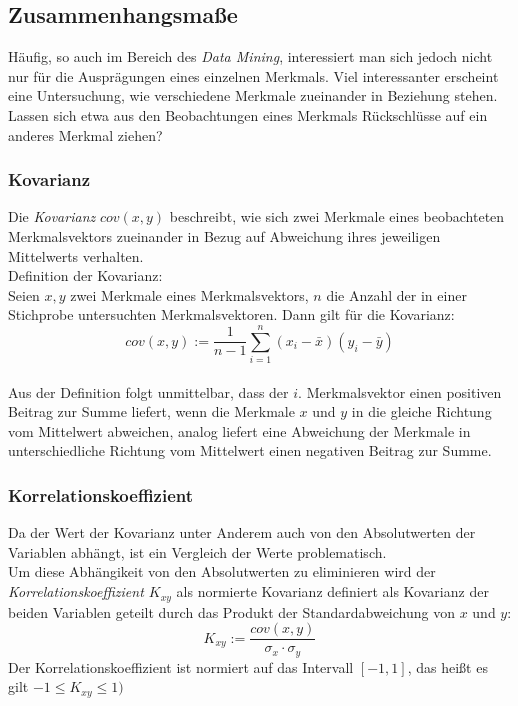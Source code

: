 \documentclass[a4paper]{scrartcl}
\begin{document}
\begin{multicols}{2}
                \subsection{Zusammenhangsmaße}
                    Häufig, so auch im Bereich des \emph{Data Mining}, interessiert man sich jedoch nicht nur für die Ausprägungen eines einzelnen Merkmals. Viel interessanter erscheint eine Untersuchung, wie verschiedene Merkmale zueinander in Beziehung stehen. Lassen sich etwa aus den Beobachtungen eines Merkmals Rückschlüsse auf ein anderes Merkmal ziehen?
                    \subsubsection{Kovarianz}
                        Die \emph{Kovarianz} $cov(x,y)$ beschreibt, wie sich zwei Merkmale eines beobachteten Merkmalsvektors zueinander in Bezug auf Abweichung ihres jeweiligen Mittelwerts verhalten. \cite{ertel2016}\\
                        Definition der Kovarianz:\\
                        Seien $x,y$ zwei Merkmale eines Merkmalsvektors, $n$ die Anzahl der in einer Stichprobe untersuchten Merkmalsvektoren. Dann gilt für die Kovarianz:
                        $$
                            cov(x,y) := \frac{1}{n-1}\sum_{i=1}^n(x_i - \bar{x})(y_i - \bar{y})
                        $$ \cite{kohn2005}\\
                        Aus der Definition folgt unmittelbar, dass der $i$. Merkmalsvektor einen positiven Beitrag zur Summe liefert, wenn die Merkmale $x$ und $y$ in die gleiche Richtung vom Mittelwert abweichen, analog liefert eine Abweichung der Merkmale in unterschiedliche Richtung vom Mittelwert einen negativen Beitrag zur Summe. \cite{ertel2016}

                    \subsubsection{Korrelationskoeffizient}
                        Da der Wert der Kovarianz unter Anderem auch von den Absolutwerten der Variablen abhängt, ist ein Vergleich der Werte problematisch.
                        \cite{ertel2016} \\
                        Um diese Abhängikeit von den Absolutwerten zu eliminieren wird der \emph{Korrelationskoeffizient $K_{xy}$} als normierte Kovarianz definiert als Kovarianz der beiden Variablen geteilt durch das Produkt der Standardabweichung von $x$ und $y$:
                        $$
                            K_{xy} := \frac{cov(x,y)}{\sigma_x \cdot \sigma_y} 
                        $$
                        Der Korrelationskoeffizient ist normiert auf das Intervall $[-1,1]$, das heißt es gilt $-1 \leq K_{xy} \leq 1)$
                        \cite{kohn2005}


\end{multicols}
\end{document}
